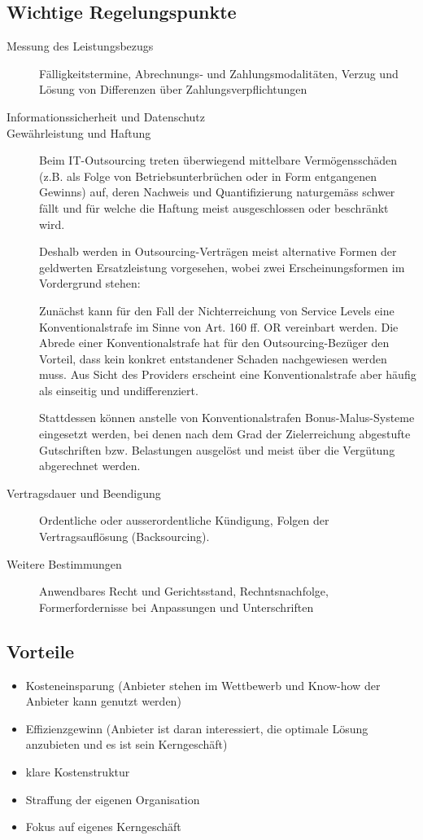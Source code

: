 \subsection{Wichtige Regelungspunkte}
\begin{description}
  \item[Messung des Leistungsbezugs] Fälligkeitstermine, Abrechnungs‐ und Zahlungsmodalitäten, Verzug und Lösung von Differenzen über Zahlungsverpflichtungen
  \item[Informationssicherheit und Datenschutz]
  \item[Gewährleistung und Haftung]
  Beim IT-Outsourcing treten überwiegend mittelbare Vermögensschäden (z.B. als Folge von Betriebsunterbrüchen oder in Form entgangenen Gewinns) auf, deren Nachweis und Quantifizierung naturgemäss schwer fällt und für welche die Haftung meist ausgeschlossen oder beschränkt wird.

  Deshalb werden in Outsourcing-Verträgen meist alternative Formen der geldwerten Ersatzleistung vorgesehen, wobei zwei Erscheinungsformen im Vordergrund stehen:

  Zunächst kann für den Fall der Nichterreichung von Service Levels eine Konventionalstrafe im Sinne von Art. 160 ff. OR vereinbart werden. Die Abrede einer Konventionalstrafe hat für den Outsourcing-Bezüger den Vorteil, dass kein konkret entstandener Schaden nachgewiesen werden muss. Aus Sicht des Providers erscheint eine Konventionalstrafe aber häufig als einseitig und undifferenziert.

  Stattdessen können anstelle von Konventionalstrafen Bonus-Malus-Systeme eingesetzt werden, bei denen nach dem Grad der Zielerreichung abgestufte Gutschriften bzw. Belastungen ausgelöst und meist über die Vergütung abgerechnet werden.
  \item[Vertragsdauer und Beendigung] Ordentliche oder ausserordentliche Kündigung, Folgen der Vertragsauflösung (Backsourcing).
  \item[Weitere Bestimmungen] Anwendbares Recht und Gerichtsstand, Rechntsnachfolge, Formerfordernisse bei Anpassungen und Unterschriften
\end{description}

\subsection{Vorteile}

\begin{itemize}
  \item Kosteneinsparung (Anbieter stehen im Wettbewerb und Know-how der Anbieter kann genutzt werden)
  \item Effizienzgewinn (Anbieter ist daran interessiert, die optimale Lösung anzubieten und es ist sein Kerngeschäft)
  \item klare Kostenstruktur
  \item Straffung der eigenen Organisation
  \item Fokus auf eigenes Kerngeschäft
\end{itemize}

